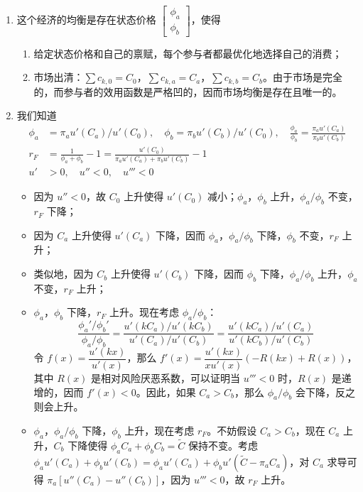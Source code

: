 \begin{solution}
\begin{enumerate}[label=(\alph*)]
    \item 这个经济的均衡是存在状态价格 $\begin{bmatrix}\phi_{a} \\ \phi_{b}\end{bmatrix}$，使得
    \begin{enumerate}[label=（\arabic*）]
        \item 给定状态价格和自己的禀赋，每个参与者都最优化地选择自己的消费；
        \item 市场出清：$\sum c_{k,0}=C_{0}$，$\sum c_{k,a}=C_{a}$，$\sum c_{k,b}=C_{b}$。由于市场是完全的，而参与者的效用函数是严格凹的，因而市场均衡是存在且唯一的。
    \end{enumerate}
    \item 我们知道
    \[
        \begin{aligned}
            \phi_{a}&=\pi_{a}u'(C_{a})/u'(C_{0}),\quad
            \phi_{b}=\pi_{b}u'(C_{b})/u'(C_{0}),\quad
            \frac{\phi_{a}}{\phi_{b}}=\frac{\pi_{a}u'(C_{a})}{\pi_{b}u'(C_{b})}\\
            r_{F}&=\frac{1}{\phi_{a}+\phi_{b}}-1=\frac{u'(C_{0})}{\pi_{a}u'(C_{a})+\pi_{b}u'(C_{b})}-1\\
            u'&>0,\quad u''<0,\quad u'''<0
        \end{aligned}
    \]
    \begin{itemize}
        \item 因为 $u''<0$，故 $C_{0}$ 上升使得 $u'(C_{0})$ 减小；$\phi_{a}$，$\phi_{b}$ 上升，$\phi_{a}/\phi_{b}$ 不变，$r_{F}$ 下降；
        \item 因为 $C_{a}$ 上升使得 $u'(C_{a})$ 下降，因而 $\phi_{a}$，$\phi_{a}/\phi_{b}$ 下降，$\phi_{b}$ 不变，$r_{F}$ 上升；
        \item 类似地，因为 $C_{b}$ 上升使得 $u'(C_{b})$ 下降，因而 $\phi_{b}$ 下降，$\phi_{a}/\phi_{b}$ 上升，$\phi_{a}$ 不变，$r_{F}$ 上升；
        \item $\phi_{a}$，$\phi_{b}$ 下降，$r_{F}$ 上升。现在考虑 $\phi_{a}/\phi_{b}$：
        \[
            \frac{\phi_{a}'/\phi_{b}'}{\phi_{a}/\phi_{b}}=\frac{u'(kC_{a})/u'(kC_{b})}{u'(C_{a})/u'(C_{b})}=\frac{u'(kC_{a})/u'(C_{a})}{u'(kC_{b})/u'(C_{b})}
        \]
        令 $f(x)=\dfrac{u'(kx)}{u'(x)}$，那么 $f'(x)=\dfrac{u'(kx)}{xu'(x)}(-R(kx)+R(x))$，其中 $R(x)$ 是相对风险厌恶系数，可以证明当 $u'''<0$ 时，$R(x)$ 是递增的，因而 $f'(x)<0$。因此，如果 $C_{a}>C_{b}$，那么 $\phi_{a}/\phi_{b}$ 会下降，反之则会上升。
        \item $\phi_{a}$，$\phi_{a}/\phi_{b}$ 下降，$\phi_{b}$ 上升，现在考虑 $r_{F}$。不妨假设 $C_{a}>C_{b}$，现在 $C_{a}$ 上升，$C_{b}$ 下降使得 $\phi_{a}C_{a}+\phi_{b}C_{b}=\tilde{C}$ 保持不变。考虑 $\phi_{a}u'(C_{a})+\phi_{b}u'(C_{b})=\phi_{a}u'(C_{a})+\phi_{b}u'(\tilde{C}-\pi_{a}C_{a})$，对 $C_{a}$ 求导可得 $\pi_{a}[u''(C_{a})-u''(C_{b})]$，因为 $u'''<0$，故 $r_{F}$ 上升。
    \end{itemize}
\end{enumerate}
\end{solution}

